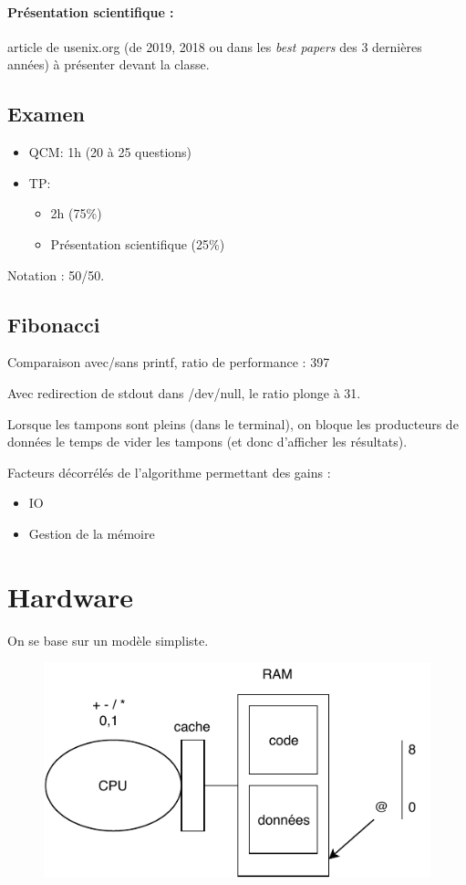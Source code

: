 \documentclass[11pt]{article}
\begin{document}
\paragraph{Présentation scientifique :} article de usenix.org (de 2019, 2018 ou dans les \textit{best papers} des 3 dernières années) à présenter devant la classe.

\subsection{Examen}
\begin{itemize}
	\item QCM: 1h (20 à 25 questions) \\
	\item TP:
	      \begin{itemize}
		      \item 2h (75\%)
		      \item Présentation scientifique (25\%)
	      \end{itemize}
\end{itemize}


Notation : 50/50.

\subsection{Fibonacci}
Comparaison avec/sans printf, ratio de performance : 397

Avec redirection de stdout dans /dev/null, le ratio plonge à 31.

Lorsque les tampons sont pleins (dans le terminal), on bloque les producteurs de données le temps de vider les tampons (et donc d'afficher les résultats).

Facteurs décorrélés de l'algorithme permettant des gains :
\begin{itemize}
	\item IO
	\item Gestion de la mémoire
\end{itemize}

\section{Hardware}
On se base sur un modèle simpliste.
\begin{figure}
	\centering
	\includegraphics{img/cpu+ram.pdf}
\end{figure}
\end{document}
